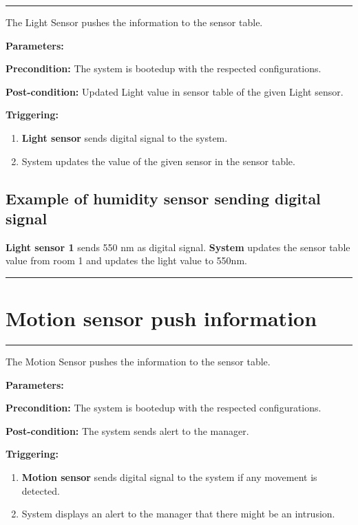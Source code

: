\hrule
\hfill
\vspace{0.5cm}
\label{operation:Light sensor push information}

The  Light Sensor pushes the information to the sensor table.
\begin{description}
\item \textbf{Parameters:} 
\item \textbf{Precondition:} The system is bootedup with the respected
configurations.
\item \textbf{Post-condition:} Updated Light value in sensor table of the given
Light sensor.

\item \textbf{Triggering:}
\begin{enumerate}
\item \textbf{Light sensor} sends digital signal to the system.
\item System updates the value of the given sensor in the sensor table.
\end{enumerate}
\end{description}

\subsection{Example of humidity sensor sending digital signal}
\textbf{Light sensor 1} sends 550 nm as digital signal. \textbf{System}
updates the sensor table value from room 1 and updates the light value to 550nm.
\hfill
\vspace{0.5cm}
\hrule


\section{Motion sensor push information}

\hrule
\hfill
\vspace{0.5cm}
\label{operation:Motion sensor push information}

The Motion Sensor pushes the information to the sensor table.
\begin{description}
\item \textbf{Parameters:} \
\item \textbf{Precondition:} The system is bootedup with the respected
configurations.
\item \textbf{Post-condition:} The system sends alert to the manager.

\item \textbf{Triggering:}
\begin{enumerate}
\item \textbf{Motion sensor} sends digital signal to the system if any movement
is detected.
\item System displays an alert to the manager that there might be an intrusion.
\end{enumerate}
\end{description}

